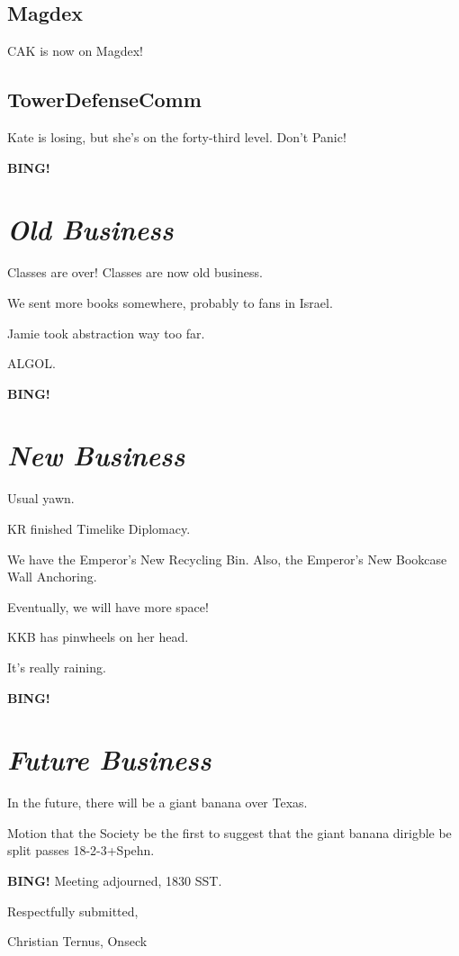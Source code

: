 \documentclass[10pt]{article}
\newcommand{\bing}{{\bf BING!} }
\newcommand{\goto}[1]{\bing \vskip 12pt \section*{{\em{#1}}}}
\begin{document}
\subsection*{Magdex}

CAK is now on Magdex!

\subsection*{TowerDefenseComm}

Kate is losing, but she's on the forty-third level.  Don't Panic!

\goto{Old Business}

Classes are over!  Classes are now old business.

We sent more books somewhere, probably to fans in Israel.

Jamie took abstraction way too far.

ALGOL.

\goto{New Business}

Usual yawn.

KR finished Timelike Diplomacy.

We have the Emperor's New Recycling Bin.  Also, the Emperor's New Bookcase Wall Anchoring.

Eventually, we will have more space!

KKB has pinwheels on her head.

It's really raining.

\goto{Future Business}

In the future, there will be a giant banana over Texas.

Motion that the Society be the first to suggest that the giant banana dirigble be split passes 18-2-3+Spehn.

\bing
\noindent
Meeting adjourned, 1830 SST.

\vspace{18pt}

\centerline{Respectfully submitted,}
\centerline{Christian Ternus, Onseck}
\end{document}
